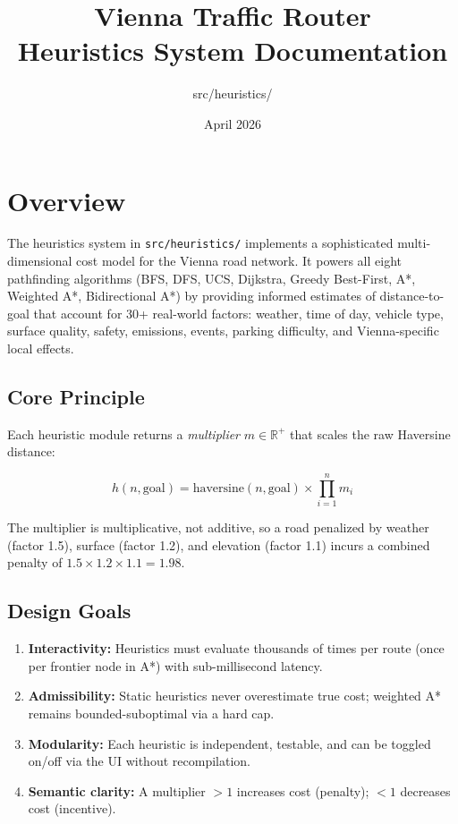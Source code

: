 \documentclass[12pt,a4paper]{article}
\title{\textbf{Vienna Traffic Router\\Heuristics System Documentation}}
\author{src/heuristics/}
\date{April 2026}
\begin{document}
\maketitle

\tableofcontents
\newpage

\section{Overview}

The heuristics system in \texttt{src/heuristics/} implements a sophisticated multi-dimensional cost model for the Vienna road network. It powers all eight pathfinding algorithms (BFS, DFS, UCS, Dijkstra, Greedy Best-First, A*, Weighted A*, Bidirectional A*) by providing informed estimates of distance-to-goal that account for 30+ real-world factors: weather, time of day, vehicle type, surface quality, safety, emissions, events, parking difficulty, and Vienna-specific local effects.

\subsection{Core Principle}

Each heuristic module returns a \textit{multiplier} $m \in \mathbb{R}^+$ that scales the raw Haversine distance:

\[
h(n, \text{goal}) = \text{haversine}(n, \text{goal}) \times \prod_{i=1}^{n} m_i
\]

The multiplier is multiplicative, not additive, so a road penalized by weather (factor 1.5), surface (factor 1.2), and elevation (factor 1.1) incurs a combined penalty of $1.5 \times 1.2 \times 1.1 = 1.98$.

\subsection{Design Goals}

\begin{enumerate}
  \item \textbf{Interactivity:} Heuristics must evaluate thousands of times per route (once per frontier node in A*) with sub-millisecond latency.
  \item \textbf{Admissibility:} Static heuristics never overestimate true cost; weighted A* remains bounded-suboptimal via a hard cap.
  \item \textbf{Modularity:} Each heuristic is independent, testable, and can be toggled on/off via the UI without recompilation.
  \item \textbf{Semantic clarity:} A multiplier $> 1$ increases cost (penalty); $< 1$ decreases cost (incentive).
\end{enumerate}
\end{document}
